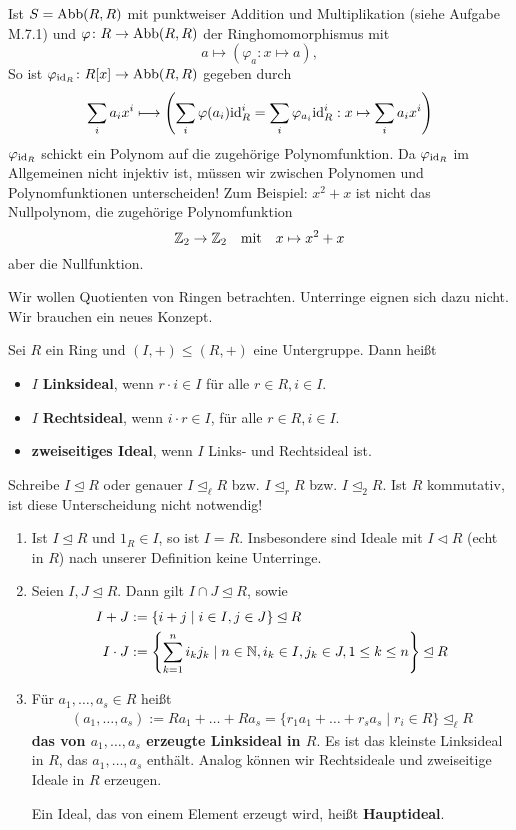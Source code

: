 \begin{beispiel}
\begin{enumerate}[label=(\arabic*)]
		Ist $S = \mathrm{Abb}(R,R)$ mit punktweiser Addition und Multiplikation (siehe Aufgabe M.7.1) und $\varphi \colon R \to \mathrm{Abb}(R,R)$ der Ringhomomorphismus mit
		\[a \mapsto (\varphi_a \colon x \mapsto a),\]
		So ist $\varphi_{\mathrm{id}_R} \colon R[x] \to \mathrm{Abb}(R,R)$ gegeben durch 
		\[\sum_i a_ix^i \longmapsto \left(\sum_i \varphi(a_i) \mathrm{id}_R^i = \sum_i \varphi_{a_i} \mathrm{id}_R^i : x \mapsto \sum_i a_i x^i\right)\]
		$\varphi_{\mathrm{id}_R}$ schickt ein Polynom auf die zugehörige Polynomfunktion. Da $\varphi_{\mathrm{id}_R}$ im Allgemeinen nicht injektiv ist, müssen wir zwischen Polynomen und Polynomfunktionen unterscheiden! Zum Beispiel: $x^2 + x$ ist nicht das Nullpolynom, die zugehörige Polynomfunktion 
		\[\mathbb{Z}_2 \to \mathbb{Z}_2 \quad\text{mit}\quad x \mapsto x^2 + x\]
		aber die Nullfunktion.
	\end{enumerate}
\end{beispiel}
Wir wollen Quotienten von Ringen betrachten. Unterringe eignen sich dazu nicht. Wir brauchen ein neues Konzept.
\begin{definition}
	Sei $R$ ein Ring und $(I,+) \leq (R,+)$ eine Untergruppe. Dann heißt
	\begin{itemize}
		\item $I$ \textbf{Linksideal}, wenn $r \cdot i \in I$ für alle $r \in R, i \in I$.
		\item $I$ \textbf{Rechtsideal}, wenn $i \cdot r \in I$, für alle $r \in R, i \in I$.
		\item \textbf{zweiseitiges Ideal}, wenn $I$ Links- und Rechtsideal ist.
	\end{itemize}
	Schreibe $I \unlhd R$ oder genauer $I \unlhd_\ell R$ bzw. $I \unlhd_r R$ bzw. $I \unlhd_2 R$. Ist $R$ kommutativ, ist diese Unterscheidung nicht notwendig! 
\end{definition}
\begin{rem}\label{rem4_8}
	\begin{enumerate}[label=(\roman*)]
		\item Ist $I \unlhd R$ und $1_R \in I$, so ist $I = R$. Insbesondere sind Ideale mit $I \lhd R$ (echt in $R$) nach unserer Definition keine Unterringe.
		\item Seien $I,J \unlhd R$. Dann gilt $I \cap J \unlhd R$, sowie 
		\begin{align*}
			I + J &:= \{i+j \mid i \in I, j \in J\} \unlhd R\\
			I \cdot J &:= \left\{\sum_{k=1}^n i_k j_k \mid n \in \mathbb{N}, i_k \in I, j_k \in J, 1 \leq k \leq n\right\} \unlhd R	
		\end{align*}
		\item Für $a_1, \dots, a_s \in R$ heißt 
		\begin{align*}
			(a_1, \dots, a_s) := Ra_1 + \dots + Ra_s = \{r_1a_1 + \dots + r_sa_s \mid r_i \in R\} \unlhd_\ell R
		\end{align*}
		\textbf{das von $a_1, \dots, a_s$ erzeugte Linksideal in $R$}. Es ist das kleinste Linksideal in $R$, das $a_1, \dots, a_s$ enthält. Analog können wir Rechtsideale und zweiseitige Ideale in $R$ erzeugen.
		
		Ein Ideal, das von einem Element erzeugt wird, heißt \textbf{Hauptideal}.
	\end{enumerate}
\end{rem}
